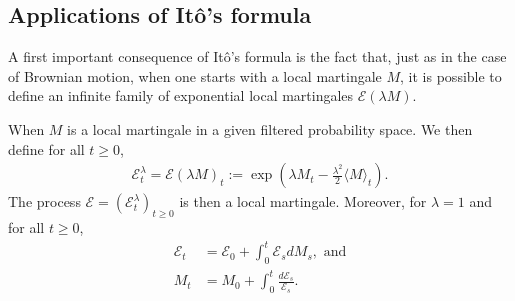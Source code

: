 \documentclass[../mainfile.tex]{subfiles}
\begin{document}
\subsection{Applications of Itô's formula}
A first important consequence of Itô's formula is the fact that, just as in the case of Brownian motion, when one starts with a local martingale $M$, it is possible to define an infinite family of exponential local martingales $\mathcal{E}( \lambda M)$.
\begin{prop}When $M$ is a local martingale in a given filtered probability space. We then define for all $t \geq 0$,
\begin{align*}
\mathcal{E}_t^\lambda= \mathcal{E}(\lambda M)_t:= \exp\left(\lambda M_t- \frac{\lambda^2}{2}\langle M \rangle_t\right).
\end{align*}
The process $\mathcal{E}=( \mathcal{E}_t^\lambda)_{t \geq 0}$ is then a local martingale. Moreover, for $\lambda=1$ and for all $t \geq 0$, 
\begin{align*}
\mathcal{E}_t&= \mathcal{E}_0 + \int_0^t \mathcal{E}_s dM_s, \text{ and} \\
M_t&= M_0 + \int_0^t \frac{d \mathcal{E}_s}{\mathcal{E}_s}.
\end{align*}
\end{prop}
\end{document}
